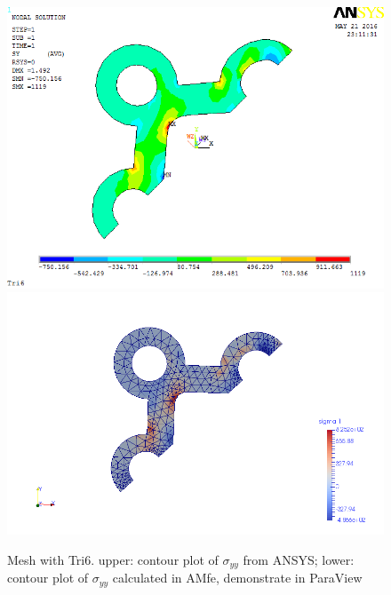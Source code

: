 \begin{figure}[htbp]
	\begin{center}
		\includegraphics[width=13cm,clip]{Tri6_Syy.png} 		
		\includegraphics[width=13cm,clip]{Tri6_Syy_P.png} 		
		\caption{Mesh with Tri6. upper: contour plot of $\sigma_{yy}$ from ANSYS; lower: contour plot of $\sigma_{yy}$ calculated in AMfe, demonstrate in ParaView} \label{fig: Tri6_Syy}
	\end{center}
\end{figure}
\clearpage 

